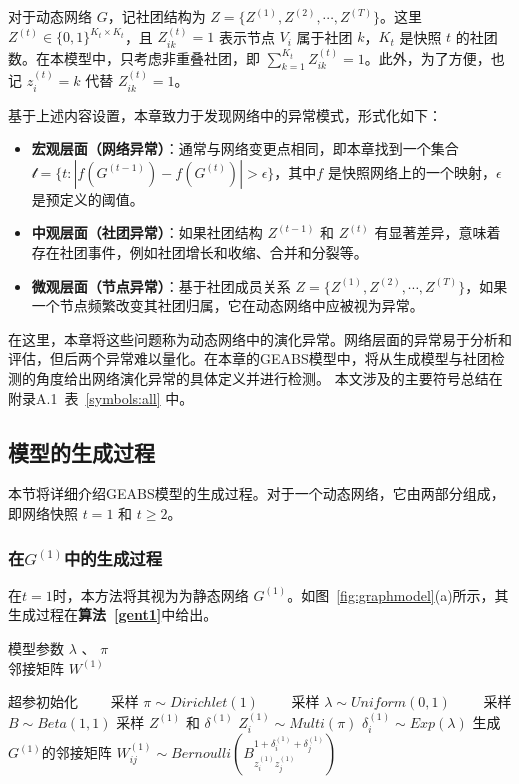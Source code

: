 对于动态网络 $G$，记社团结构为 $Z = \{ Z^{(1)}, Z^{(2)}, \cdots, Z^{(T)} \}$。这里 $Z^{(t)} \in \{0, 1 \}^{K_t \times K_t}$，且 $Z^{(t)}_{ik} = 1$ 表示节点 $V_i$ 属于社团 $k$，$K_t$ 是快照 $t$ 的社团数。在本模型中，只考虑非重叠社团，即 $\sum_{k=1}^{K_t} Z^{(t)}_{ik} = 1$。此外，为了方便，也记 $z^{(t)}_{i} = k$ 代替 $Z^{(t)}_{ik} = 1$。



基于上述内容设置，本章致力于发现网络中的异常模式，形式化如下：
\begin{itemize}
    \item \textbf{宏观层面（网络异常）}：通常与网络变更点相同，即本章找到一个集合 $\mathcal{t} = \{t : |f(G^{(t-1)}) -f(G^{(t)})| > \epsilon  \} $，其中$f$ 是快照网络上的一个映射，$\epsilon$是预定义的阈值。
    \item \textbf{中观层面（社团异常）}：如果社团结构 $Z^{(t-1)}$ 和 $Z^{(t)}$ 有显著差异，意味着存在社团事件，例如社团增长和收缩、合并和分裂等。
    \item \textbf{微观层面（节点异常）}：基于社团成员关系 $Z = \{ Z^{(1)}, Z^{(2)}, \cdots, Z^{(T)} \}$，如果一个节点频繁改变其社团归属，它在动态网络中应被视为异常。
\end{itemize}

在这里，本章将这些问题称为动态网络中的演化异常。网络层面的异常易于分析和评估，但后两个异常难以量化。在本章的GEABS模型中，将从生成模型与社团检测的角度给出网络演化异常的具体定义并进行检测。
本文涉及的主要符号总结在附录A.1~表~\ref{symbols:all} 中。

\subsection{模型的生成过程}

本节将详细介绍GEABS模型的生成过程。对于一个动态网络，它由两部分组成，即网络快照 $t=1$ 和 $t \ge 2$。

\subsubsection{在$G^{(1)}$中的生成过程}
在$t=1$时，本方法将其视为为静态网络 $G^{(1)}$。如图~\ref{fig:graphmodel}(a)所示，其生成过程在\textbf{算法~\ref{gent1}}中给出。

\begin{algorithm}[H]
\caption{$t=1$的网络快照的生成过程}\label {gent1}
\algorithmicrequire \; 模型参数 $\lambda$ 、 $\pi$ \\
\algorithmicensure \; 邻接矩阵 $W^{(1)}$
\begin{algorithmic}[1]
\STATE 超参初始化
\STATE ~~~~采样 $\pi \sim Dirichlet (1)$ 
\STATE ~~~~采样 $\lambda \sim Uniform(0,1)$
\STATE ~~~~采样 $B \sim Beta(1,1)$
\STATE 采样 $Z^{(1)}$ 和 $\delta^{(1)}$
\STATE $Z_i^{(1)} \sim Multi(\pi)$
\STATE $\delta^{(1)}_i \sim Exp(\lambda)$
\ENDFOR
\STATE 生成$G^{(1)}$的邻接矩阵
\STATE $W^{(1)}_{ij} \sim Bernoulli(B_{z_i^{(1)} z_j^{(1)}}^{1+\delta_i^{(1)} + \delta_j^{(1)}})$
\ENDFOR
\end{algorithmic}
\end{algorithm}


